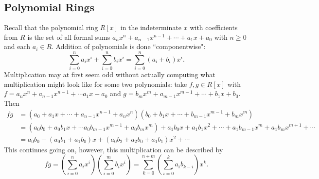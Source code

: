 \documentclass[9pt,reqno]{amsart}
\theoremstyle{definition}
\begin{document}
\subsection{Polynomial Rings}

Recall that the polynomial ring $R[x]$ in the indeterminate $x$ with coefficients from $R$ is the set of all formal sums $a_n x^n + a_{n-1} x^{n-1} + \cdots + a_1 x + a_0$ with $n \geq 0$ and each $a_i \in R$. Addition of polynomials is done ``componentwise": $$\sum_{i=0}^n a_i x^i +\sum_{i=0}^n b_i x^i = \sum_{i = 0}^n (a_i + b_i)x^i. $$
Multiplication may at first seem odd without actually computing what multiplication might look like for some two polynomials: take $f, g \in R[x]$ with $f = a_n x^n + a_{n-1}x^{n-1} + \cdots a_1 x +a_0$ and $g = b_m x^m + a_{m-1} x^{m-1} + \cdots + b_1 x + b_0$. Then 
\begin{align}
	f g &= (a_0 + a_1 x + \cdots +a_{n-1} x^{n-1} + a_n x^n )  (b_0 + b_1 x +\cdots + b_{m-1} x^{m-1} + b_mx^m) \\
	&= (a_0b_0 + a_0 b_1 x + \cdots a_0 b_{m-1} x^{m-1} + a_0 b_m x^m )+ a_1 b_0 x + a_1 b_1 x^2 + \cdots + a_1 b_{m-1} x^m + a_1 b_m x^{m+1} + \cdots  \\ 
	&= a_0 b_0 + (a_0 b_1 + a_1 b_0 )x + (a_0b_2 + a_2 b_0 + a_1 b_1) x^2 + \cdots
\end{align}
This continues going on, however, this multiplication can be described by 
$$fg = \left (\sum_{i= 0}^n a_i x^i \right) \left ( \sum_{i=0}^m b_i x^i \right) = \sum_{k=0}^{n+m} \left (\sum_{i=0}^k a_i b_{k-i} \right) x^k.$$
\end{document}
